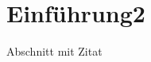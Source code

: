 \documentclass[11pt,a4paper]{report}
\begin{document}





\tableofcontents

\newpage


\section{Einführung2}\label{einfuxfchrung2}

Abschnitt mit Zitat \cite{WebComponentsC24:online}

\newpage











\end{document}
